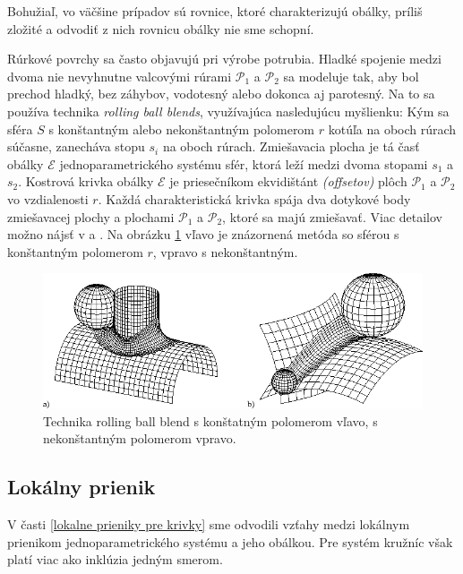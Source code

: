 Bohužiaľ, vo väčšine prípadov sú rovnice, ktoré charakterizujú obálky, príliš zložité a odvodiť z nich rovnicu obálky nie sme schopní.

Rúrkové povrchy sa často objavujú pri výrobe potrubia. Hladké spojenie medzi dvoma nie nevyhnutne valcovými rúrami $\mathcal{P}_1$ a $\mathcal{P}_2$ sa modeluje tak, aby bol prechod hladký, bez záhybov, vodotesný alebo dokonca aj parotesný. Na to sa používa technika \textit{rolling ball blends}, využívajúca nasledujúcu myšlienku: Kým sa sféra $S$ s konštantným alebo nekonštantným polomerom $r$ kotúľa na oboch rúrach súčasne, zanecháva stopu $s_i$ na oboch rúrach. Zmiešavacia plocha je tá časť obálky $\mathcal{E}$ jednoparametrického systému sfér, ktorá leží medzi dvoma stopami $s_1$ a $s_2$. Kostrová krivka obálky $\mathcal{E}$ je priesečníkom ekvidištánt \textit{(offsetov)} plôch $\mathcal{P}_1$ a $\mathcal{P}_2$ vo vzdialenosti $r$. Každá charakteristická krivka spája dva dotykové body zmiešavacej plochy a plochami $\mathcal{P}_1$ a $\mathcal{P}_2$, ktoré sa majú zmiešavať. Viac detailov možno nájsť v \cite{Kar00} a \cite{Ode20}. Na obrázku \ref{fig:rolling_ball_blends} vľavo je znázornená metóda so sférou s konštantným polomerom $r$, vpravo s nekonštantným.

\begin{figure}[H]
	\centering
	\includegraphics[width=\textwidth]{images/rolling_ball_blends.png}
	\caption[Technika rolling ball blends.]{Technika rolling ball blend s konštatným polomerom vľavo, s nekonštantným polomerom vpravo. \cite{Rollingballblends}}
	\label{fig:rolling_ball_blends}
\end{figure}

\subsection{Lokálny prienik}
V časti \ref{lokalne prieniky pre krivky} sme odvodili vzťahy medzi lokálnym prienikom jednoparametrického systému a jeho obálkou. Pre systém kružníc však platí viac ako inklúzia jedným smerom.

